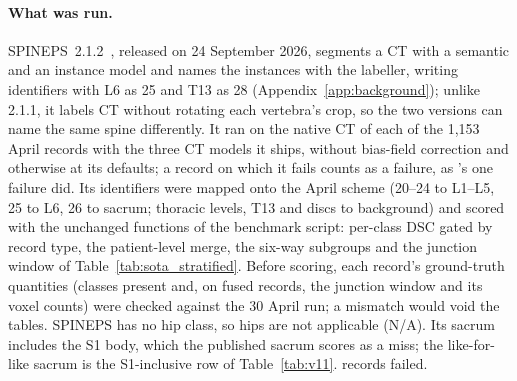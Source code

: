 \paragraph{What was run.}
SPINEPS~2.1.2~\citep{MollerSPINEPSSoftware}, released on 24 September 2026, segments a CT
with a semantic and an instance model and names the instances with the \VERIDAH{}
labeller, writing \VerSe{} identifiers with L6 as 25 and T13 as 28
(Appendix~\ref{app:background}); unlike 2.1.1, it labels CT without rotating each
vertebra's crop, so the two versions can name the same spine differently. It ran on the
native CT of each of the 1{,}153 April records with the three CT models it ships, without
bias-field correction and otherwise at its defaults; a record on which it fails counts as
a failure, as \TS{}'s one failure did. Its identifiers were mapped onto the April scheme
(20--24 to L1--L5, 25 to L6, 26 to sacrum; thoracic levels, T13 and discs to background)
and scored with the unchanged functions of the \TS{} benchmark script: per-class DSC gated
by record type, the patient-level merge, the six-way subgroups and the junction window of
Table~\ref{tab:sota_stratified}. Before scoring, each record's ground-truth quantities
(classes present and, on fused records, the junction window and its voxel counts) were
checked against the 30 April \TS{} run; a mismatch would void the tables. SPINEPS has no
hip class, so hips are not applicable (N/A). Its sacrum includes the S1 body, which the
published \TS{} sacrum scores as a miss; the like-for-like \TS{} sacrum is the S1-inclusive
row of Table~\ref{tab:v11}. \PENDING{} records failed.

